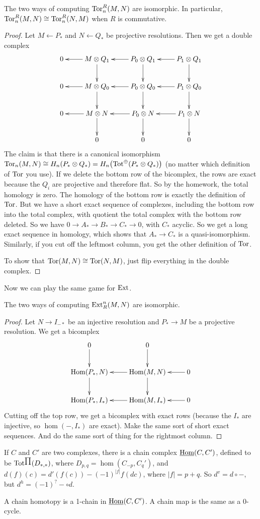\begin{corollary}[of HW2, prob.~2]
 The two ways of computing $\operatorname{Tor}^R_n(M,N)$ are isomorphic. In particular, $\operatorname{Tor}^R_n(M,N)\cong \operatorname{Tor}^R_n(N,M)$ when $R$ is commutative.
\end{corollary}
\begin{proof}
 Let $M\leftarrow P_*$ and $N\leftarrow Q_*$ be projective resolutions. Then we get a double complex
 \[\xymatrix{
  0& M\otimes Q_1\ar[l]\ar[d] & P_0\otimes Q_1 \ar[l]\ar[d] & P_1\otimes Q_1\ar[l]\ar[d]\\
  0& M\otimes Q_0\ar[l]\ar[d] & P_0\otimes Q_0 \ar[l]\ar[d] & P_1\otimes Q_0\ar[l]\ar[d]\\
  0& M\otimes N\ar[l]\ar[d] & P_0\otimes N \ar[l]\ar[d] & P_1\otimes N\ar[l]\ar[d]\\
  & 0 & 0 & 0
 }\]
 The claim is that there is a canonical isomorphism $\operatorname{Tor}_n(M,N)\cong H_n(P_*\otimes Q_*)=H_n\bigl(\operatorname{Tot}^\oplus(P_*\otimes Q_*)\bigr)$ (no matter which definition of $\operatorname{Tor}$ you use). If we delete the bottom row of the bicomplex, the rows are exact because the $Q_i$ are projective and therefore flat. So by the homework, the total homology is zero. The homology of the bottom row is exactly the definition of $\operatorname{Tor}$. But we have a short exact sequence of complexes, including the bottom row into the total complex, with quotient the total complex with the bottom row deleted. So we have $0\to A_*\to B_*\to C_*\to 0$, with $C_*$ acyclic. So we get a long exact sequence in homology, which shows that $A_*\to C_*$ is a quasi-isomorphism. Similarly, if you cut off the leftmost column, you get the other definition of $\operatorname{Tor}$.
 
 To show that $\operatorname{Tor}(M,N)\cong \operatorname{Tor}(N,M)$, just flip everything in the double complex.
\end{proof}

Now we can play the same game for $\operatorname{Ext}$.
\begin{corollary}
 The two ways of computing $\operatorname{Ext}^n_R(M,N)$ are isomorphic.
\end{corollary}
\begin{proof}
 Let $N\to I_{-*}$ be an injective resolution and $P_*\to M$ be a projective resolution. We get a bicomplex
 \[\xymatrix{
  0\ar[d] & 0\ar[d]\\
  \hom(P_*,N) \ar[d] & \hom(M,N)\ar[l]\ar[d] & 0  \ar[l] \\
  \hom(P_*,I_*) & \hom(M,I_*) \ar[l] & 0\ar[l]
 }\]
 Cutting off the top row, we get a bicomplex with exact rows (because the $I_*$ are injective, so $\hom(-,I_*)$ are exact). Make the same sort of short exact sequences. And do the same sort of thing for the rightmost column.
\end{proof}
If $C$ and $C'$ are two complexes, there is a chain complex $\operatorname{\underline{Hom}}(C,C')$, defined to be $\operatorname{Tot}^\prod(D_{*,*})$, where $D_{p,q}=\hom(C_{-p},C_q')$, and $d(f)(c)=d'(f(c))-(-1)^{|f|}f(dc)$, where $|f|= p+q$. So $d^v=d\circ -$, but $d^h=(-1)^? -\circ d$.

A chain homotopy is a 1-chain in $\operatorname{\underline{Hom}}(C,C')$. A chain map is the same as a 0-cycle.




